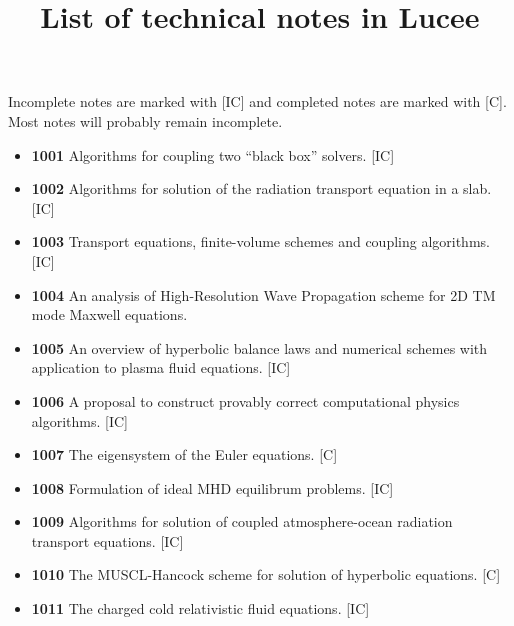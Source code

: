 \documentclass[11pt]{article}
\title{List of technical notes in Lucee}
\author{}
\date{}
\begin{document}
\maketitle

Incomplete notes are marked with [IC] and completed notes are marked
with [C]. Most notes will probably remain incomplete.

\begin{itemize}
  \item {\bf 1001} Algorithms for coupling two ``black box'' solvers. [IC]
  \item {\bf 1002} Algorithms for solution of the radiation transport
    equation in a slab. [IC]
  \item {\bf 1003} Transport equations, finite-volume schemes and
    coupling algorithms. [IC]
  \item {\bf 1004} An analysis of High-Resolution Wave Propagation
    scheme for 2D TM mode Maxwell equations.
  \item {\bf 1005} An overview of hyperbolic balance laws and
    numerical schemes with application to plasma fluid equations. [IC]
  \item {\bf 1006} A proposal to construct provably correct
    computational physics algorithms. [IC]
  \item {\bf 1007} The eigensystem of the Euler equations. [C]
  \item {\bf 1008} Formulation of ideal MHD equilibrum problems. [IC]
  \item {\bf 1009} Algorithms for solution of coupled atmosphere-ocean
    radiation transport equations. [IC]
  \item {\bf 1010} The MUSCL-Hancock scheme for solution of hyperbolic
    equations. [C]
  \item {\bf 1011} The charged cold relativistic fluid equations. [IC]
\end{itemize}
\end{document}
